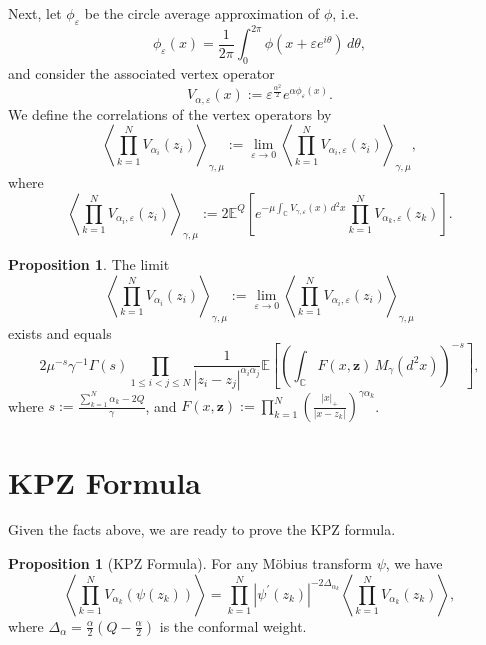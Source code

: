 \documentclass[reqno]{amsart}
\let\bg\boldsymbol
\newcommand{\s}[2]{\sum_{#1}^{#2}}
\newcommand{\id}[4]{\int_{#1}^{#2}#3\,d#4}
\newcommand{\idd}[4]{\int_{#1}^{#2}#3\,d^2#4}
\newcommand{\im}[4]{\int_{#1}^{#2}#3\,#4}
\newcommand{\p}{\prime}
\renewcommand{\l}{\left}
\renewcommand{\r}{\right}
\newcommand{\la}{\langle}
\newcommand{\ra}{\rangle}
\newcommand{\C}{\mathbb{C}}
\newcommand{\E}{\mathbb{E}}
\renewcommand{\a}{\alpha}
\renewcommand{\epsilon}{\varepsilon}
\newcommand{\e}{\epsilon}
\theoremstyle{definition}
\newtheorem{proposition}[theorem]{Proposition}
\begin{document}
Next, let $\phi_\e$ be the circle average approximation of $\phi$, i.e.
\[\phi_\e(x)=\frac{1}{2\pi}\id{0}{2\pi}{\phi(x+\e e^{i\theta})}{\theta},\]
and consider the associated vertex operator
\[V_{\a,\e}(x):=\e^{\frac{\a^2}{2}}e^{\a\phi_\e(x)}.\]
We define the correlations of the vertex operators by
\[\l\la\prod_{k=1}^NV_{\a_i}(z_i)\r\ra_{\gamma,\mu}:=\lim_{\e\to0}\l\la\prod_{k=1}^NV_{\a_i,\e}(z_i)\r\ra_{\gamma,\mu},\]
where
\[\l\la\prod_{k=1}^NV_{\a_i,\e}(z_i)\r\ra_{\gamma,\mu}:=2\E^Q\l[e^{-\mu\idd{\C}{}{V_{\gamma,\e}(x)}{x}}\prod_{k=1}^NV_{\a_k,\e}(z_k)\r].\]

\begin{proposition}
The limit
\[\l\la\prod_{k=1}^NV_{\a_i}(z_i)\r\ra_{\gamma,\mu}:=\lim_{\e\to0}\l\la\prod_{k=1}^NV_{\a_i,\e}(z_i)\r\ra_{\gamma,\mu}\]
exists and equals
\[2\mu^{-s}\gamma^{-1}\Gamma(s)\prod_{1\leq i<j\leq N}\frac{1}{|z_i-z_j|^{\a_i\a_j}}\E\l[\l(\im{\C}{}{F(x,\bg{z})}{M_\gamma(d^2x)}\r)^{-s}\r],\]
where $s:=\frac{\s{k=1}{N}\a_k-2Q}{\gamma}$, and  $F(x,\bg{z}):=\prod_{k=1}^N\l(\frac{|x|_+}{|x-z_k|}\r)^{\gamma\a_k}$.
\end{proposition}

\section{KPZ Formula}

Given the facts above, we are ready to prove the KPZ formula.

\begin{proposition}[KPZ Formula]
For any M\"obius transform $\psi$, we have
\[\l\la\prod_{k=1}^NV_{\a_k}(\psi(z_k))\r\ra=\prod_{k=1}^N|\psi^\p(z_k)|^{-2\Delta_{\a_k}}\l\la\prod_{k=1}^NV_{\a_k}(z_k)\r\ra,\]
where $\Delta_\a=\frac{\a}{2}(Q-\frac{\a}{2})$ is the conformal weight.
\end{proposition}
\end{document}
